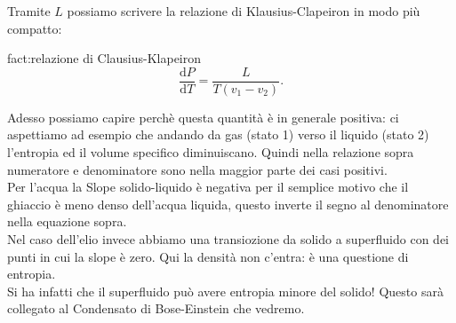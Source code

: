 Tramite $L$ possiamo scrivere la relazione di Klausius-Clapeiron in modo più compatto:
\begin{fact}{fact:relazione di Clausius-Klapeiron}
\[
	\frac{\mbox{d} P}{\mbox{d} T} = \frac{L}{T\left( v_1-v_2 \right) }
.\] 
\end{fact}
Adesso possiamo capire perchè questa quantità è in generale positiva: ci aspettiamo ad esempio che andando da gas (stato 1) verso il liquido (stato 2) l'entropia ed il volume specifico diminuiscano. Quindi nella relazione sopra numeratore e denominatore sono nella maggior parte dei casi positivi.\\
Per l'acqua la Slope solido-liquido è negativa per il semplice motivo che il ghiaccio è meno denso dell'acqua liquida, questo inverte il segno al denominatore nella equazione sopra.\\
Nel caso dell'elio invece abbiamo una transiozione da solido a superfluido con dei punti in cui la slope è zero. Qui la densità non c'entra: è una questione di entropia. \\
Si ha infatti che il superfluido può avere entropia minore del solido! Questo sarà collegato al Condensato di Bose-Einstein che vedremo.

